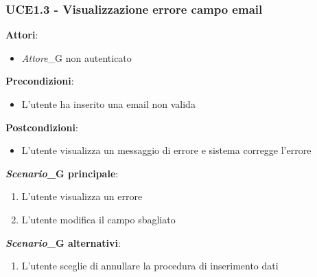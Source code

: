 \subsubsection{UCE1.3 - Visualizzazione errore campo email}
\textbf{Attori}:
\begin{itemize}
    \item \textit{Attore}_G non autenticato
\end{itemize}
\textbf{Precondizioni}:
\begin{itemize}
    \item L'utente ha inserito una email non valida
\end{itemize}
\textbf{Postcondizioni}:
\begin{itemize}
    \item L'utente visualizza un messaggio di errore e sistema corregge l'errore
\end{itemize}
\textbf{\textit{Scenario}_G principale}:
\begin{enumerate}
    \item L'utente visualizza un errore 
    \item L'utente modifica il campo sbagliato
\end{enumerate}
\textbf{\textit{Scenario}_G alternativi}:
\begin{enumerate}
    \item L'utente sceglie di annullare la procedura di inserimento dati
\end{enumerate}